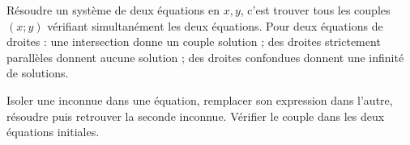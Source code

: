 \begin{cours}[Définition]
Résoudre un système de deux équations en $x,y$, c'est trouver tous les couples $(x;y)$ vérifiant simultanément les deux équations. Pour deux équations de droites : une intersection donne un couple solution ; des droites strictement parallèles donnent aucune solution ; des droites confondues donnent une infinité de solutions.
\end{cours}
\begin{methode}[Substitution]
Isoler une inconnue dans une équation, remplacer son expression dans l'autre, résoudre puis retrouver la seconde inconnue. Vérifier le couple dans les deux équations initiales.
\end{methode}

